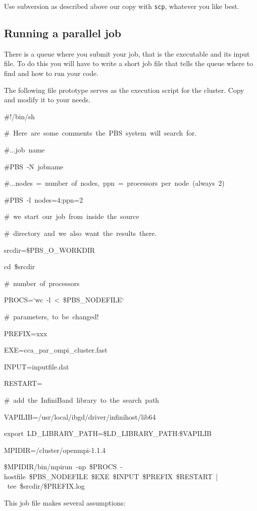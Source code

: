 Use subversion as described above our copy with \texttt{scp}, whatever
you like best.


\subsection{Running a parallel job}

There is a queue where you submit your job, that is the executable
and its input file. To do this you will have to write a short job
file that tells the queue where to find and how to run your code.

The following file prototype serves as the execution script for the
cluster. Copy and modify it to your needs. 

\begin{lyxcode}
\#!/bin/sh

\#~Here~are~some~comments~the~PBS~system~will~search~for.

\#...job~name~

\#PBS~-N~jobname~

\#...nodes~=~number~of~nodes,~ppn~=~processors~per~node~(always~2)

\#PBS~-l~nodes=4:ppn=2



\#~we~start~our~job~from~inside~the~source

\#~directory~and~we~also~want~the~results~there.

srcdir=\$PBS\_O\_WORKDIR~

cd~\$srcdir



\#~number~of~processors

PROCS=`wc~-l~<~\$PBS\_NODEFILE`~



\#~parameters,~to~be~changed!

PREFIX=xxx~

EXE=cca\_par\_ompi\_cluster.fast

INPUT=inputfile.dat

RESTART=



\#~add~the~InfiniBand~library~to~the~search~path

VAPILIB=/usr/local/ibgd/driver/infinihost/lib64~

export~LD\_LIBRARY\_PATH=\$LD\_LIBRARY\_PATH:\$VAPILIB



MPIDIR=/cluster/openmpi-1.1.4



\$MPIDIR/bin/mpirun~-np~\$PROCS~-hostfile~\$PBS\_NODEFILE~\$EXE~\$INPUT~\$PREFIX~\$RESTART~|~tee~\$srcdir/\$PREFIX.log~


\end{lyxcode}
This job file makes several assumptions:

